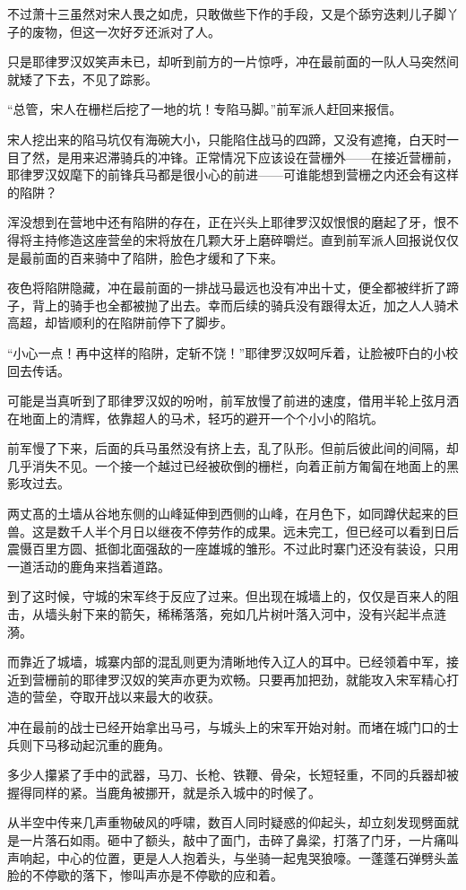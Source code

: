 不过萧十三虽然对宋人畏之如虎，只敢做些下作的手段，又是个舔穷迭剌儿子脚丫子的废物，但这一次好歹还派对了人。

只是耶律罗汉奴笑声未已，却听到前方的一片惊呼，冲在最前面的一队人马突然间就矮了下去，不见了踪影。

“总管，宋人在栅栏后挖了一地的坑！专陷马脚。”前军派人赶回来报信。

宋人挖出来的陷马坑仅有海碗大小，只能陷住战马的四蹄，又没有遮掩，白天时一目了然，是用来迟滞骑兵的冲锋。正常情况下应该设在营栅外——在接近营栅前，耶律罗汉奴麾下的前锋兵马都是很小心的前进——可谁能想到营栅之内还会有这样的陷阱？

浑没想到在营地中还有陷阱的存在，正在兴头上耶律罗汉奴恨恨的磨起了牙，恨不得将主持修造这座营垒的宋将放在几颗大牙上磨碎嚼烂。直到前军派人回报说仅仅是最前面的百来骑中了陷阱，脸色才缓和了下来。

夜色将陷阱隐藏，冲在最前面的一排战马最远也没有冲出十丈，便全都被绊折了蹄子，背上的骑手也全都被抛了出去。幸而后续的骑兵没有跟得太近，加之人人骑术高超，却皆顺利的在陷阱前停下了脚步。

“小心一点！再中这样的陷阱，定斩不饶！”耶律罗汉奴呵斥着，让脸被吓白的小校回去传话。

可能是当真听到了耶律罗汉奴的吩咐，前军放慢了前进的速度，借用半轮上弦月洒在地面上的清辉，依靠超人的马术，轻巧的避开一个个小小的陷坑。

前军慢了下来，后面的兵马虽然没有挤上去，乱了队形。但前后彼此间的间隔，却几乎消失不见。一个接一个越过已经被砍倒的栅栏，向着正前方匍匐在地面上的黑影攻过去。

两丈髙的土墙从谷地东侧的山峰延伸到西侧的山峰，在月色下，如同蹲伏起来的巨兽。这是数千人半个月日以继夜不停劳作的成果。远未完工，但已经可以看到日后震慑百里方圆、抵御北面强敌的一座雄城的雏形。不过此时寨门还没有装设，只用一道活动的鹿角来挡着道路。

到了这时候，守城的宋军终于反应了过来。但出现在城墙上的，仅仅是百来人的阻击，从墙头射下来的箭矢，稀稀落落，宛如几片树叶落入河中，没有兴起半点涟漪。

而靠近了城墙，城寨内部的混乱则更为清晰地传入辽人的耳中。已经领着中军，接近到营栅前的耶律罗汉奴的笑声亦更为欢畅。只要再加把劲，就能攻入宋军精心打造的营垒，夺取开战以来最大的收获。

冲在最前的战士已经开始拿出马弓，与城头上的宋军开始对射。而堵在城门口的士兵则下马移动起沉重的鹿角。

多少人攥紧了手中的武器，马刀、长枪、铁鞭、骨朵，长短轻重，不同的兵器却被握得同样的紧。当鹿角被挪开，就是杀入城中的时候了。

从半空中传来几声重物破风的呼啸，数百人同时疑惑的仰起头，却立刻发现劈面就是一片落石如雨。砸中了额头，敲中了面门，击碎了鼻梁，打落了门牙，一片痛叫声响起，中心的位置，更是人人抱着头，与坐骑一起鬼哭狼嚎。一蓬蓬石弹劈头盖脸的不停歇的落下，惨叫声亦是不停歇的应和着。

